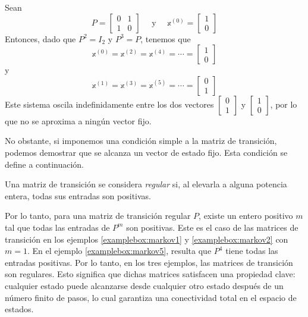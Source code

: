 \begin{examplebox}{}{}
    Sean
    $$P = \begin{bmatrix}
        0 & 1 \\
        1 & 0
    \end{bmatrix} \quad \text{ y } \quad \mathbb{x}^{(0)} = \begin{bmatrix}
        1 \\
        0
    \end{bmatrix}$$
    Entonces, dado que $P^2 = I_2$ y $P^3 = P$, tenemos que
    $$\mathbb{x}^{(0)} = \mathbb{x}^{(2)} = \mathbb{x}^{(4)} = \cdots = \begin{bmatrix} 1 \\ 0 \end{bmatrix}$$
    y
    $$\mathbb{x}^{(1)} = \mathbb{x}^{(3)} = \mathbb{x}^{(5)} = \cdots = \begin{bmatrix} 0 \\ 1 \end{bmatrix}$$
    Este sistema oscila indefinidamente entre los dos vectores $\begin{bmatrix} 0 \\ 1 \end{bmatrix}$ y $\begin{bmatrix} 1 \\ 0 \end{bmatrix}$, por lo que no se aproxima a ningún vector fijo.
\end{examplebox}

No obstante, si imponemos una condición simple a la matriz de transición, podemos demostrar que se alcanza un vector de estado fijo. Esta condición se define a continuación.

\begin{definicion}{}{}
    Una matriz de transición se considera \emph{regular} si, al elevarla a alguna potencia entera, todas sus entradas son positivas.
\end{definicion}

Por lo tanto, para una matriz de transición regular $P$, existe un entero positivo $m$ tal que todas las entradas de $P^m$ son positivas. Este es el caso de las matrices de transición en los ejemplos \ref{examplebox:markov1} y \ref{examplebox:markov2} con $m = 1$. En el ejemplo \ref{examplebox:markov5}, resulta que $P^4$ tiene todas las entradas positivas. Por lo tanto, en los tres ejemplos, las matrices de transición son regulares. Esto significa que dichas matrices satisfacen una propiedad clave: cualquier estado puede alcanzarse desde cualquier otro estado después de un número finito de pasos, lo cual garantiza una conectividad total en el espacio de estados.


